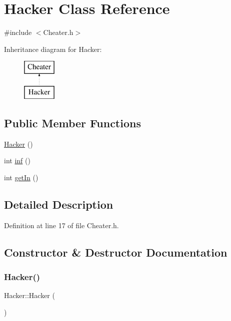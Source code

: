\hypertarget{class_hacker}{}\section{Hacker Class Reference}
\label{class_hacker}


{\ttfamily \#include $<$Cheater.\+h$>$}

Inheritance diagram for Hacker\+:\begin{figure}[H]
\begin{center}
\leavevmode
\includegraphics[height=2.000000cm]{class_hacker}
\end{center}
\end{figure}
\subsection*{Public Member Functions}
\begin{DoxyCompactItemize}
\item 
\hyperlink{class_hacker_a889b4f00996b962004d59d9a4f500ba1}{Hacker} ()
\item 
int \hyperlink{class_hacker_ad55877a5c4ad1020fee175d1809093e4}{inf} ()
\item 
int \hyperlink{class_hacker_ad03458f6342db62d108acabebe33a4a9}{get\+In} ()
\end{DoxyCompactItemize}


\subsection{Detailed Description}


Definition at line 17 of file Cheater.\+h.



\subsection{Constructor \& Destructor Documentation}
\hypertarget{class_hacker_a889b4f00996b962004d59d9a4f500ba1}{}\label{class_hacker_a889b4f00996b962004d59d9a4f500ba1} 
\subsubsection{\texorpdfstring{Hacker()}{Hacker()}}
{\footnotesize\ttfamily Hacker\+::\+Hacker (\begin{DoxyParamCaption}{ }\end{DoxyParamCaption})\hspace{0.3cm}{\ttfamily [inline]}}



